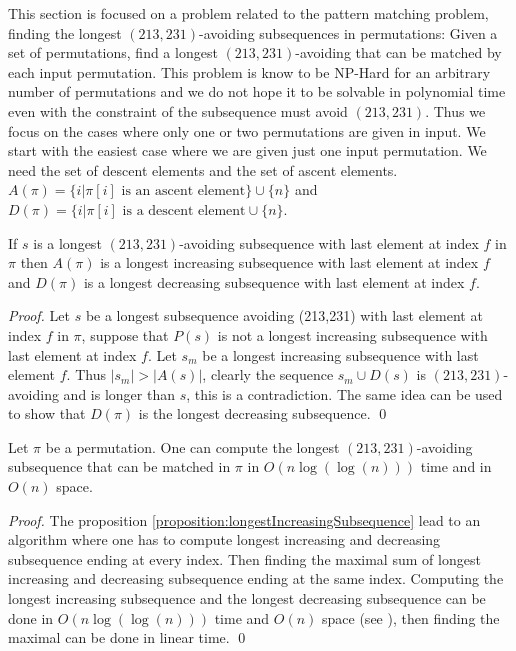 \documentclass[a4paper]{llncs}
\newcounter{num}
\begin{document}
	This section is focused on a problem related to the pattern matching problem, finding the longest $(213,231)$-avoiding subsequences in permutations:
	Given a set of permutations, find a longest $(213,231)$-avoiding that can be matched
	by each input permutation.
	This problem is know to be NP-Hard for an arbitrary number of permutations and we do not hope it to be solvable in polynomial time even with the constraint of the subsequence must avoid $(213,231)$. Thus we focus on the cases where only one or two permutations are given in input.
	We start with the easiest case where we are given just one input permutation.
	We need the set of descent elements and the set of ascent elements.
	$A(\pi) = \{i | \text{$\pi[i]$ is an ascent element} \} \cup \{n\}$ and
	$D(\pi) = \{i | \text{$\pi[i]$ is a descent element} \cup \{n\}$.\\

	\begin{proposition}
	\label{proposition:longestIncreasingSubsequence}
	If $s$ is a longest $(213,231)$-avoiding subsequence with last element at index 
	$f$ in $\pi$ then
	$A(\pi)$ is a longest increasing subsequence with last element at index $f$ and
	$D(\pi)$ is a longest decreasing subsequence with last element at index $f$.
	\end{proposition}

	\begin{proof}
	Let $s$ be a longest subsequence avoiding (213,231) with last element at index $f$ in $\pi$,
	suppose that $P(s)$ is not a longest increasing subsequence with last element at index $f$. Let $s_m$ be a longest increasing subsequence with last element $f$.
	Thus $|s_m|>|A(s)|$, clearly the sequence $s_m \cup D(s)$
	is $(213,231)$-avoiding and is longer than $s$, this is a contradiction.
	The same idea can be used to show that $D(\pi)$ is the longest decreasing subsequence.
	\qed
	\end{proof}

	\begin{proposition}
	Let $\pi$ be a permutation. One can compute
	the longest $(213,231)$-avoiding subsequence that can be matched in $\pi$
	in $O(n\log(\log(n)))$ time and in $O(n)$ space.
	\end{proposition}

	\begin{proof}
	The proposition \ref{proposition:longestIncreasingSubsequence} lead to an algorithm
	where one has to compute longest increasing and decreasing subsequence ending at every index. Then finding the maximal sum of longest increasing and decreasing subsequence ending at the same index.
	Computing the longest increasing subsequence and the longest decreasing subsequence can be done in 
	$O(n\log(\log(n)))$ time and $O(n)$ space 
	(see \cite{Bespamyatnikh00enumeratinglongest}), 
	then finding the maximal can be done in linear time.
	\qed
	\end{proof}
\end{document}
